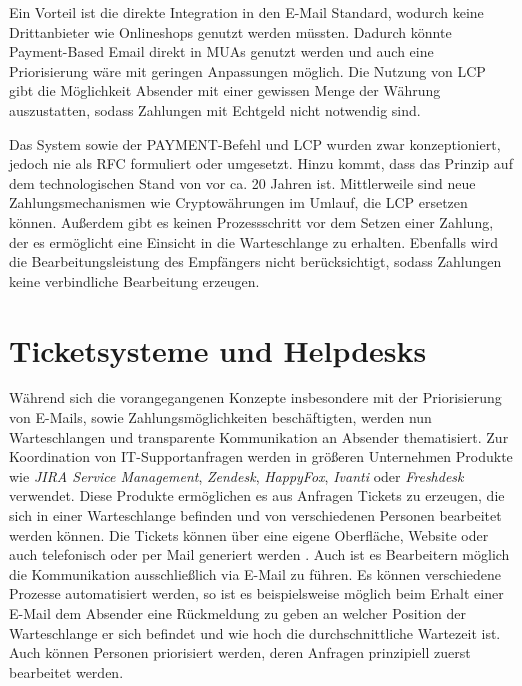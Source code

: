 Ein Vorteil ist die direkte Integration in den E-Mail Standard, wodurch keine Drittanbieter wie Onlineshops genutzt werden müssten. Dadurch könnte Payment-Based Email direkt in MUAs genutzt werden und auch eine Priorisierung wäre mit geringen Anpassungen möglich. Die Nutzung von LCP gibt die Möglichkeit Absender mit einer gewissen Menge der Währung auszustatten, sodass Zahlungen mit Echtgeld nicht notwendig sind.

Das System sowie der PAYMENT-Befehl und LCP wurden zwar konzeptioniert, jedoch nie als RFC formuliert oder umgesetzt. Hinzu kommt, dass das Prinzip auf dem technologischen Stand von vor ca. 20 Jahren ist. Mittlerweile sind neue Zahlungsmechanismen wie Cryptowährungen im Umlauf, die LCP ersetzen können. Außerdem gibt es keinen Prozessschritt vor dem Setzen einer Zahlung, der es ermöglicht eine Einsicht in die Warteschlange zu erhalten. Ebenfalls wird die Bearbeitungsleistung des Empfängers nicht berücksichtigt, sodass Zahlungen keine verbindliche Bearbeitung erzeugen. \citep[S. 3 f.]{Turner2003}


\section{Ticketsysteme und Helpdesks}
Während sich die vorangegangenen Konzepte insbesondere mit der Priorisierung von E-Mails, sowie Zahlungsmöglichkeiten beschäftigten, werden nun Warteschlangen und transparente Kommunikation an Absender thematisiert. Zur Koordination von IT-Supportanfragen werden in größeren Unternehmen Produkte wie \textit{JIRA Service Management}, \textit{Zendesk}, \textit{HappyFox}, \textit{Ivanti} oder \textit{Freshdesk} verwendet. Diese Produkte ermöglichen es aus Anfragen Tickets zu erzeugen, die sich in einer Warteschlange befinden und von verschiedenen Personen bearbeitet werden können. Die Tickets können über eine eigene Oberfläche, Website oder auch telefonisch oder per Mail generiert werden \citep{jiramail}. Auch ist es Bearbeitern möglich die Kommunikation ausschließlich via E-Mail zu führen. Es können verschiedene Prozesse automatisiert werden, so ist es beispielsweise möglich beim Erhalt einer E-Mail dem Absender eine Rückmeldung zu geben an welcher Position der Warteschlange er sich befindet und wie hoch die durchschnittliche Wartezeit ist. Auch können Personen priorisiert werden, deren Anfragen prinzipiell zuerst bearbeitet werden.

